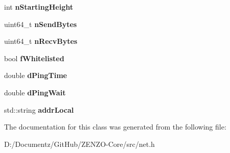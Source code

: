 \begin{DoxyCompactItemize}
int {\bfseries n\+Starting\+Height}
\item 
\mbox{\label{class_c_node_stats_a3c70b0862e9ddd682380114016196137}} 
uint64\+\_\+t {\bfseries n\+Send\+Bytes}
\item 
\mbox{\label{class_c_node_stats_a1aaec0f47a95487cbd709caf15889663}} 
uint64\+\_\+t {\bfseries n\+Recv\+Bytes}
\item 
\mbox{\label{class_c_node_stats_a39afa3b5edc1747678667aae5acab3ec}} 
bool {\bfseries f\+Whitelisted}
\item 
\mbox{\label{class_c_node_stats_a535c198cbe3af112d4538f535e6618cd}} 
double {\bfseries d\+Ping\+Time}
\item 
\mbox{\label{class_c_node_stats_a03a38f87940d04b321b9fb3102d0368d}} 
double {\bfseries d\+Ping\+Wait}
\item 
\mbox{\label{class_c_node_stats_a027a5445a0c40e6489875e653be9c758}} 
std\+::string {\bfseries addr\+Local}
\end{DoxyCompactItemize}


The documentation for this class was generated from the following file\+:\begin{DoxyCompactItemize}
\item 
D\+:/\+Documentz/\+Git\+Hub/\+Z\+E\+N\+Z\+O-\/\+Core/src/net.\+h\end{DoxyCompactItemize}
